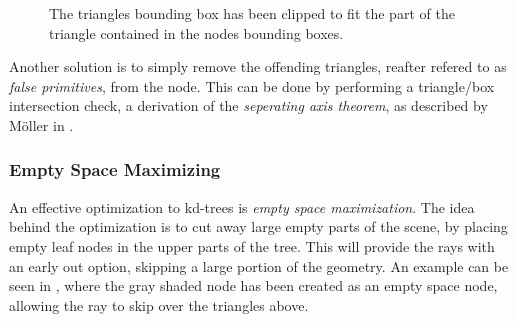 \begin{figure}
  \centering

  \vspace{3mm}
  \parbox{5cm}{ \caption[Triangle clipping.]{The triangles bounding
      box has been clipped to fit the part of the triangle contained
      in the nodes bounding boxes.}\label{fig:aabbClipped}}
\end{figure}

Another solution is to simply remove the offending triangles, reafter
refered to as \textit{false primitives}, from the node. This can be
done by performing a triangle/box intersection check, a derivation of
the \textit{seperating axis theorem}, as described by Möller in
.


\subsubsection{Empty Space Maximizing}\label{sec:emptySpace}

An effective optimization to kd-trees is \textit{empty space
  maximization}. The idea behind the optimization is to cut away large
empty parts of the scene, by placing empty leaf nodes in the upper
parts of the tree. This will provide the rays with an early out
option, skipping a large portion of the geometry. An example can be
seen in , where the gray shaded node has
been created as an empty space node, allowing the ray to skip over the
triangles above.

